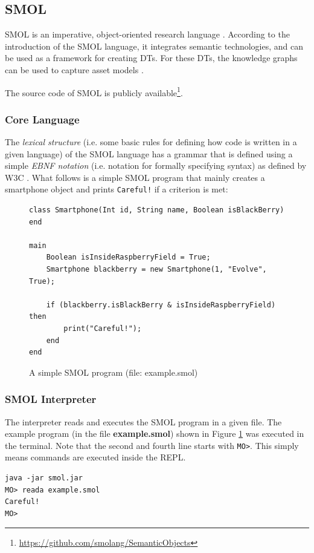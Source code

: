 \documentclass{article}
\begin{document}
\subsection{SMOL}\label{subsec:SMOL}
SMOL is an imperative, object-oriented research language \cite{noauthor_smol_nodate-1}. According to the introduction of the SMOL language, it integrates semantic technologies, and can be used as a framework for creating DTs. For these DTs, the knowledge graphs can be used to capture asset models \cite{noauthor_introduction_nodate}.

The source code of SMOL is publicly available\footnote{\url{https://github.com/smolang/SemanticObjects}}.

\subsubsection{Core Language}\label{subsubsec:CoreLanguage}
The \emph{lexical structure} (i.e. some basic rules for defining how code is written in a given language) of the SMOL language has a grammar that is defined using a simple \emph{EBNF notation} (i.e. notation for formally specifying syntax) as defined by W3C \cite{noauthor_lexical_nodate, noauthor_ebnf_nodate}. What follows is a simple SMOL program that mainly creates a smartphone object and prints \verb|Careful!| if a criterion is met:

\begin{figure}[H]
    \centering
    \caption{A simple SMOL program (file: example.smol)}
    \label{fig:smol_program}
    \begin{Verbatim}[frame=single]
class Smartphone(Int id, String name, Boolean isBlackBerry) end

main
    Boolean isInsideRaspberryField = True;
    Smartphone blackberry = new Smartphone(1, "Evolve", True);

    if (blackberry.isBlackBerry & isInsideRaspberryField) then
        print("Careful!");
    end
end

    \end{Verbatim}
\end{figure}

\subsubsection{SMOL Interpreter}\label{subsubsec:SMOLInterpreter}

The interpreter reads and executes the SMOL program in a given file. The example program (in the file \textbf{example.smol}) shown in Figure \ref{fig:smol_program} was executed in the terminal. Note that the second and fourth line starts with \verb|MO>|. This simply means commands are executed inside the REPL.
\begin{Verbatim}[frame=single]
java -jar smol.jar
MO> reada example.smol
Careful!
MO>
\end{Verbatim}
\end{document}
